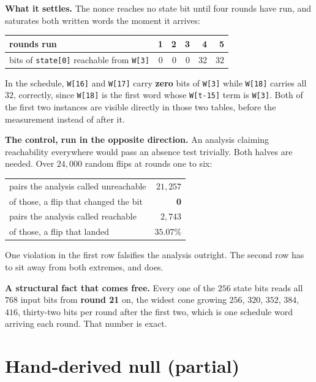 \textbf{What it settles.} The nonce reaches no state bit until four rounds have run, and saturates both written words the moment it arrives:

\begin{center}
\begin{tabular}{@{}lrrrrr@{}}
\toprule
rounds run & 1 & 2 & 3 & 4 & 5 \\
\midrule
bits of \texttt{state[0]} reachable from \texttt{W[3]} & 0 & 0 & 0 & 32 & 32 \\
\bottomrule
\end{tabular}
\end{center}

In the schedule, \texttt{W[16]} and \texttt{W[17]} carry \textbf{zero} bits of \texttt{W[3]} while \texttt{W[18]} carries all \(32\), correctly, since \texttt{W[18]} is the first word whose \texttt{W[t-15]} term is \texttt{W[3]}. Both of the first two instances are visible directly in those two tables, before the measurement instead of after it.

\textbf{The control, run in the opposite direction.} An analysis claiming reachability everywhere would pass an absence test trivially. Both halves are needed. Over \(24{,}000\) random flips at rounds one to six:

\begin{center}
\begin{tabular}{@{}lr@{}}
\toprule
pairs the analysis called unreachable & \(21{,}257\) \\
of those, a flip that changed the bit & \textbf{0} \\
pairs the analysis called reachable & \(2{,}743\) \\
of those, a flip that landed & \(35.07\%\) \\
\bottomrule
\end{tabular}
\end{center}

One violation in the first row falsifies the analysis outright. The second row has to sit away from both extremes, and does.

\textbf{A structural fact that comes free.} Every one of the \(256\) state bits reads all \(768\) input bits from \textbf{round 21} on, the widest cone growing \(256\), \(320\), \(352\), \(384\), \(416\), thirty-two bits per round after the first two, which is one schedule word arriving each round. That number is exact.

\section{Hand-derived null (partial)}

